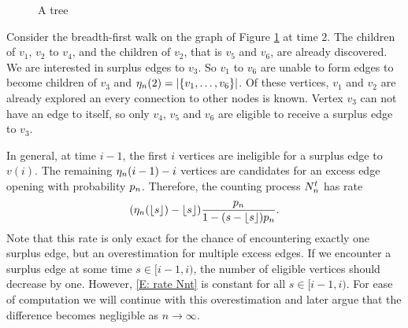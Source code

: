 \begin{figure}[ht]
	
	\caption{A tree} 
	\label{F: Surplus Edges Tree}
\end{figure}

Consider the breadth-first walk on the graph of Figure \ref{F: Surplus Edges Tree} at time $2$.
The children of $v_1$, $v_2$ to $v_4$, and the children of $v_2$, that is $v_5$ and $v_6$, are already discovered.
We are interested in surplus edges to $v_3$.
So $v_1$ to $v_6$ are unable to form edges to become children of $v_3$ and $\eta_n(2) = |\{ v_1, \dots,  v_6\}|$.
Of these vertices, $v_1$ and $v_2$ are already explored an every connection to other nodes is known.
Vertex $v_3$ can not have an edge to itself, so only $v_4$, $v_5$ and $v_6$ are eligible to receive a surplus edge to $v_3$.

In general, at time $i-1$, the first $i$ vertices are ineligible for a surplus edge to $v(i)$.
The remaining $\eta_n(i-1) - i$ vertices are candidates for an excess edge opening with probability $p_n$.
Therefore, the counting process $N_n^t$ has rate
\begin{equation} \label{E: rate Nnt}
(\eta_n(\lfloor s\rfloor) - \lfloor s\rfloor) \frac{p_n}{1-(s-\lfloor s\rfloor)p_n}.
\end{equation}
Note that this rate is only exact for the chance of encountering exactly one surplus edge, 
but an overestimation for multiple excess edges.
If we encounter a surplus edge at some time $s \in [i-1, i)$,
the number of eligible vertices should decrease by one.
However, \eqref{E: rate Nnt} is constant for all $s \in [i-1, i)$.
For ease of computation we will continue with this overestimation and later argue that the difference becomes negligible as $n \rightarrow \infty$.

